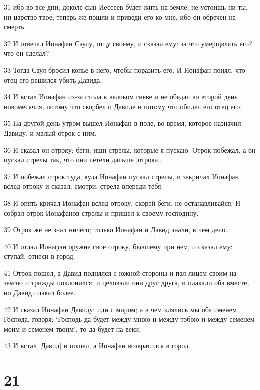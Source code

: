 \par 31 ибо во все дни, доколе сын Иессеев будет жить на земле, не устоишь ни ты, ни царство твое; теперь же пошли и приведи его ко мне, ибо он обречен на смерть.
\par 32 И отвечал Ионафан Саулу, отцу своему, и сказал ему: за что умерщвлять его? что он сделал?
\par 33 Тогда Саул бросил копье в него, чтобы поразить его. И Ионафан понял, что отец его решился убить Давида.
\par 34 И встал Ионафан из-за стола в великом гневе и не обедал во второй день новомесячия, потому что скорбел о Давиде и потому что обидел его отец его.
\par 35 На другой день утром вышел Ионафан в поле, во время, которое назначил Давиду, и малый отрок с ним.
\par 36 И сказал он отроку: беги, ищи стрелы, которые я пускаю. Отрок побежал, а он пускал стрелы так, что они летели дальше [отрока].
\par 37 И побежал отрок туда, куда Ионафан пускал стрелы, и закричал Ионафан вслед отроку и сказал: смотри, стрела впереди тебя.
\par 38 И опять кричал Ионафан вслед отроку: скорей беги, не останавливайся. И собрал отрок Ионафанов стрелы и пришел к своему господину.
\par 39 Отрок же не знал ничего; только Ионафан и Давид знали, в чем дело.
\par 40 И отдал Ионафан оружие свое отроку, бывшему при нем, и сказал ему: ступай, отнеси в город.
\par 41 Отрок пошел, а Давид поднялся с южной стороны и пал лицем своим на землю и трижды поклонился; и целовали они друг друга, и плакали оба вместе, но Давид плакал более.
\par 42 И сказал Ионафан Давиду: иди с миром; а в чем клялись мы оба именем Господа, говоря: `Господь да будет между мною и между тобою и между семенем моим и семенем твоим', то да будет на веки.
\par 43 И встал [Давид] и пошел, а Ионафан возвратился в город.

\chapter{21}

